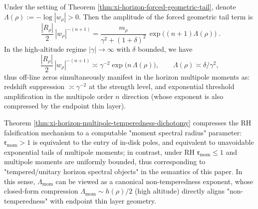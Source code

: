 \begin{corollary}\label{cor:xi-horizon-redshift-growth-threshold}
Under the setting of Theorem \ref{thm:xi-horizon-forced-geometric-tail}, denote
\(\Lambda(\rho):=-\log|w_{\rho}|>0\).
Then the amplitude of the forced geometric tail term is
\begin{equation}\label{eq:xi-horizon-forced-term-amplitude}
\boxed{\;
\frac{|R_{\rho}|}{2}\,|w_{\rho}|^{-(n+1)}
=\frac{m_{\rho}}{\gamma^{2}+(1+\delta)^{2}}\,
\exp\!\bigl((n+1)\Lambda(\rho)\bigr)\; }.
\end{equation}
In the high-altitude regime \(|\gamma|\to\infty\) with \(\delta\) bounded, we have
\[
\frac{|R_{\rho}|}{2}\,|w_{\rho}|^{-(n+1)}
\asymp
\gamma^{-2}\exp\!\bigl(n\,\Lambda(\rho)\bigr),
\qquad
\Lambda(\rho)\asymp \delta/\gamma^{2},
\]
thus off-line zeros simultaneously manifest in the horizon multipole moments as: redshift suppression \(\asymp\gamma^{-2}\) at the strength level, and exponential threshold amplification in the multipole order \(n\) direction (whose exponent is also compressed by the endpoint thin layer).
\end{corollary}

\begin{remark}\label{rem:xi-horizon-nontempered-parameter-semantics}
Theorem \ref{thm:xi-horizon-multipole-temperedness-dichotomy} compresses the RH falsification mechanism to a computable "moment spectral radius" parameter:
\(\mathfrak{r}_{\mathrm{mom}}>1\) is equivalent to the entry of in-disk poles, and equivalent to unavoidable exponential tails of multipole moments;
in contrast, under RH \(\mathfrak{r}_{\mathrm{mom}}\le 1\) and multipole moments are uniformly bounded, thus corresponding to "tempered/unitary horizon spectral objects" in the semantics of this paper.
In this sense, \(\Lambda_{\mathrm{mom}}\) can be viewed as a canonical non-temperedness exponent, whose closed-form compression \(\Lambda_{\mathrm{mom}}\sim h(\rho)/2\) (high altitude) directly aligns "non-temperedness" with endpoint thin layer geometry.
\end{remark}

\endinput
